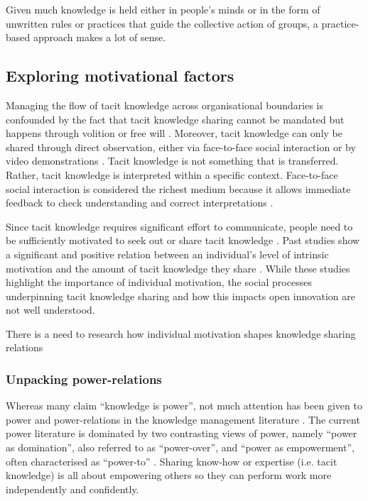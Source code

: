 {{ Given much knowledge is held either in people's minds or in the form of unwritten rules or practices that guide the collective action of groups, a practice-based approach makes a lot of sense.

\medskip


\subsection{Exploring motivational factors}

Managing the flow of tacit knowledge across organisational boundaries is confounded by the fact that tacit knowledge sharing cannot be mandated but happens through volition or free will \citep{polanyi1966tacit}. Moreover, tacit knowledge can only be shared through direct observation, either via face-to-face social interaction or by video demonstrations \citep{haldin2000difficulties,koskinen2003tacit}. Tacit knowledge is not something that is transferred. Rather, tacit knowledge is interpreted within a specific context. Face-to-face social interaction is considered the richest medium because it allows immediate feedback to check understanding and correct interpretations \citep{koskinen2003tacit}. \medskip

Since tacit knowledge requires significant effort to communicate, people need to be sufficiently motivated to seek out or share tacit knowledge \citep{leonard1998role}. Past studies show a significant and positive relation between an individual's level of intrinsic motivation and the amount of tacit knowledge they share \citep[e.g.][]{osterloh2000motivation,kaser2001knowledge,smith2001role}. While these studies highlight the importance of individual motivation, the social processes underpinning tacit knowledge sharing and how this impacts open innovation are not well understood. 


There is a need to research how individual motivation shapes knowledge sharing relations

\medskip

\subsubsection{Unpacking power-relations}

Whereas many claim \enquote{knowledge is power}, not much attention has been given to power and power-relations in the knowledge management literature \citep{heizmann2015power}. The current power literature is dominated by two contrasting views of power, namely \enquote{power as domination}, also referred to as \enquote{power-over}, and \enquote{power as empowerment}, often characterised as \enquote{power-to} \citep{haugaard2012rethinking}. Sharing know-how or expertise (i.e. tacit knowledge) is all about empowering others so they can perform work more independently and confidently. \medskip

}}
